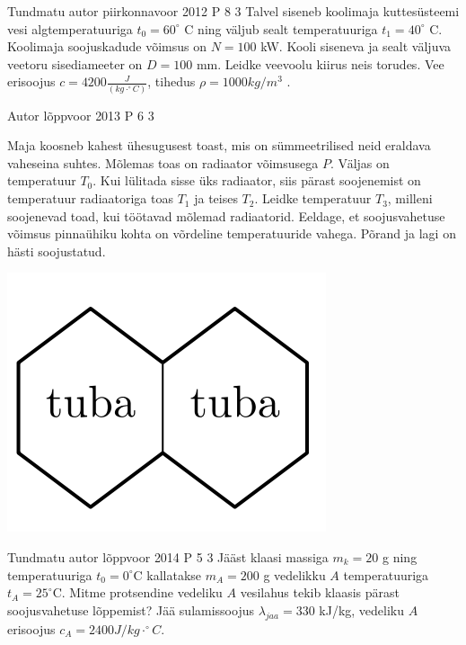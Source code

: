 \documentclass[11pt]{article}
\begin{document}
{%
{Tundmatu autor} %
{piirkonnavoor} %
{2012} %
{P 8} %
{3} %
{
\ifStatement
Talvel siseneb koolimaja kuttesüsteemi vesi algtemperatuuriga $t_0 = 60^{\circ}$ C ning väljub sealt temperatuuriga $t_1 = 40^{\circ}$ C. Koolimaja soojuskadude võimsus on $N = 100$ kW. Kooli siseneva ja sealt väljuva veetoru sisediameeter on $D = 100$ mm. Leidke veevoolu kiirus neis torudes. Vee erisoojus $c = 4200 \frac{J}{(kg \cdot ^{\circ}C)}$, tihedus $\rho = 1000 kg/m^3$ .
\fi
}

{Autor} %
{lõppvoor} %
{2013} %
{P 6} %
{3} %
{
\ifStatement
Maja koosneb kahest ühesugusest toast, mis on sümmeetrilised neid eraldava vaheseina suhtes. Mõlemas toas on radiaator võimsusega $P$. Väljas on temperatuur $T_0$. Kui lülitada sisse üks radiaator, siis pärast soojenemist on temperatuur radiaatoriga toas $T_1$ ja teises $T_2$. Leidke temperatuur $T_3$, milleni soojenevad toad, kui töötavad mõlemad radiaatorid. Eeldage, et soojusvahetuse võimsus pinnaühiku kohta on võrdeline temperatuuride vahega. Põrand ja lagi on hästi soojustatud. 
\begin{center}
	\includegraphics[width=0.5\linewidth]{2013-v3p-06-yl.PNG}
\end{center}
\fi
}

{Tundmatu autor} %
{lõppvoor} %
{2014} %
{P 5} %
{3} %
{
\ifStatement
Jääst klaasi massiga $m_k = 20$ g ning temperatuuriga $t_0 = 0^{\circ}$C kallatakse $m_A=200$ g vedelikku $A$ temperatuuriga  $t_A = 25^{\circ}$C. Mitme protsendine vedeliku $A$ vesilahus tekib klaasis pärast soojusvahetuse lõppemist? Jää sulamissoojus $\lambda_{jaa} = 330$ kJ/kg, vedeliku $A$ erisoojus $c_A = 2400 J/kg \cdot ^{\circ}C$.
\fi
}

}
\end{document}
